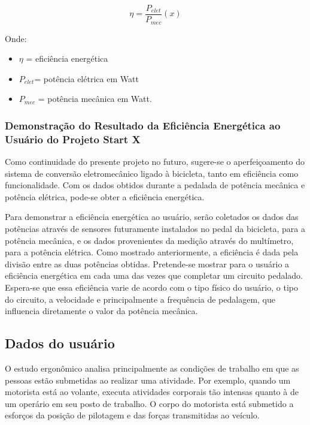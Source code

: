 \begin{equation}
\label{eficiencia-energetica}
\eta =\frac{P_{elet}}{P_{mec}}\left ( x \right )
\end{equation}

Onde: 

\begin{itemize}

  \item $\eta$ = eficiência energética
  \item $P_{elet}$= potência elétrica em Watt
  \item $P_{mec} $ = potência mecânica em Watt.
\end{itemize}

\subsubsection{Demonstração do Resultado da Eficiência Energética ao Usuário do Projeto Start X}

Como continuidade do presente projeto no futuro, sugere-se o aperfeiçoamento do sistema de conversão eletromecânico ligado à bicicleta, tanto em eficiência como funcionalidade. Com os dados obtidos durante a pedalada de potência mecânica e potência elétrica, pode-se obter a eficiência energética. 

Para demonstrar a eficiência energética ao usuário, serão coletados os dados das potências através de sensores futuramente instalados no pedal da bicicleta, para a potência mecânica, e os dados provenientes da medição através do multímetro, para a potência elétrica. Como mostrado anteriormente, a eficiência é dada pela divisão entre as duas potências obtidas. Pretende-se mostrar para o usuário a eficiência energética em cada uma das vezes que completar um circuito pedalado. Espera-se que essa eficiência varie de acordo com o tipo físico do usuário, o tipo do circuito, a velocidade e principalmente a frequência de pedalagem, que influencia diretamente o valor da potência mecânica.

\subsection{Dados do usuário}
\label{dados-usuario}
O estudo ergonômico analisa principalmente as condições de trabalho em que as pessoas estão submetidas ao realizar uma atividade. Por exemplo, quando um motorista está ao volante, executa atividades corporais tão intensas quanto à de um operário em seu posto de trabalho. O corpo do motorista está submetido a esforços da posição de pilotagem e das forças transmitidas ao veículo. 

